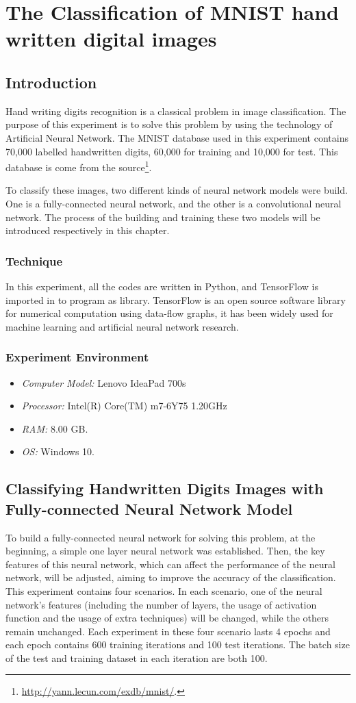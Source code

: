 \documentclass[]{UCD_CS_FYP_Report}
\begin{document}
\chapter{\label{chapter3}The Classification of MNIST hand written digital images}
\section{Introduction}
Hand writing digits recognition is a classical problem in image classification. The purpose of this experiment is to solve this problem by using the technology of Artificial Neural Network. The MNIST database used in this experiment contains 70,000 labelled handwritten digits, 60,000 for training and 10,000 for test. This database is come from the source\footnote{\url{http://yann.lecun.com/exdb/mnist/}.}.

To classify these images, two different kinds of neural network models were build. One is a fully-connected neural network, and the other is a convolutional neural network. The process of the building and training these two models will be introduced respectively in this chapter.
\subsection{Technique}
In this experiment, all the codes are written in Python, and TensorFlow is imported in to program as library. TensorFlow is an open source software library for numerical computation using data-flow graphs, it has been widely used for machine learning and artificial neural network research. 
\subsection{Experiment Environment}
\begin{itemize}
\item {\sl Computer Model:} Lenovo IdeaPad 700s
\item {\sl Processor:} Intel(R) Core(TM) m7-6Y75 1.20GHz
\item {\sl RAM:} 8.00 GB.
\item {\sl OS:} Windows 10.
\end{itemize}
\section{Classifying Handwritten Digits Images with Fully-connected Neural Network Model}
To build a fully-connected neural network for solving this problem, at the beginning, a simple one layer neural network was established. Then, the key features of this neural network, which can affect the performance of the neural network, will be adjusted, aiming to improve the accuracy of the classification. This experiment contains four scenarios. In each scenario, one of the neural network’s features (including the number of layers, the usage of activation function and the usage of extra techniques) will be changed, while the others remain unchanged. Each experiment in these four scenario lasts 4 epochs and each epoch contains 600 training iterations and 100 test iterations. The batch size of the test and training dataset in each iteration are both 100.
\end{document}
